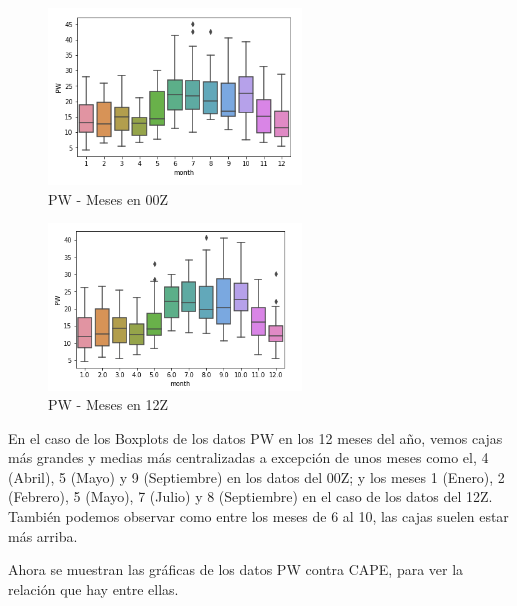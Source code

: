 \documentclass[a4paper]{article}
\begin{document}
\pagebreak
\begin{figure}[ht!]
 \centering
  \includegraphics[width=0.6\textwidth]{00Z_Boxplot_PW.png}
  \caption{PW - Meses en 00Z}
\end{figure}
\begin{figure}[ht!]
 \centering
  \includegraphics[width=0.6\textwidth]{12Z_Boxplot_PW.png}
  \caption{PW - Meses en 12Z}
\end{figure}

En el caso de los Boxplots de los datos PW en los 12 meses del año, vemos cajas más grandes y medias más centralizadas a excepción de unos meses como el, 4 (Abril), 5 (Mayo) y 9 (Septiembre) en los datos del 00Z; y los meses 1 (Enero), 2 (Febrero), 5 (Mayo), 7 (Julio) y 8 (Septiembre)  en el caso de los datos del 12Z. También podemos observar como entre los meses de 6 al 10, las cajas suelen estar más arriba. 

\pagebreak
Ahora se muestran las gráficas de los datos PW contra CAPE, para ver la relación que hay entre ellas.
\end{document}
